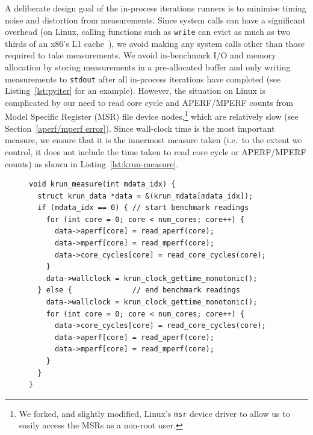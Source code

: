 \documentclass[preprint,numbers,10pt]{sigplanconf}
\begin{document}
A deliberate design goal of the in-process iterations runners is to minimise
timing noise and distortion from measurements. Since system calls can have a
significant overhead (on Linux, calling functions such as \texttt{write} can
evict as much as two thirds of an x86's L1 cache~\cite{soares10flexsc}), we
avoid making any system calls other than those required to take measurements. We
avoid in-benchmark I/O and memory allocation by storing measurements in a
pre-allocated buffer and only writing measurements to \texttt{stdout} after all
in-process iterations have completed (see Listing~\ref{lst:pyiter} for an
example). However, the situation on Linux is complicated by our need to read
core cycle and APERF/MPERF counts from Model Specific Register (MSR) file device
nodes,\footnote{We forked, and slightly modified, Linux's \texttt{msr} device
driver to allow us to easily access the MSRs as a non-root user.} which are relatively
slow (see Section~\ref{aperf/mperf error}). Since wall-clock time
is the most important measure, we ensure that it is the innermost measure taken
(i.e.~to the extent we control, it does not include the time taken to read
core cycle or APERF/MPERF counts) as shown in Listing~\ref{lst:krun-measure}.

\begin{figure}[t]
\begin{lstlisting}[label=lst:krun-measure, xleftmargin=0cm,
        caption={%
\texttt{krun\_measure}: Measuring before (the \texttt{if's} true branch) and
after (its false branch) a benchmark. Since
wall-clock time is the most important measure, it is innermost; since
the APERF/MPERF counters are a sanity check, they are outermost. Note that
the APERF/MPERF counters must be read in the same order before
and after a benchmark.}]
void krun_measure(int mdata_idx) {
  struct krun_data *data = &(krun_mdata[mdata_idx]);
  if (mdata_idx == 0) { // start benchmark readings
    for (int core = 0; core < num_cores; core++) {
      data->aperf[core] = read_aperf(core);
      data->mperf[core] = read_mperf(core);
      data->core_cycles[core] = read_core_cycles(core);
    }
    data->wallclock = krun_clock_gettime_monotonic();
  } else {              // end benchmark readings
    data->wallclock = krun_clock_gettime_monotonic();
    for (int core = 0; core < num_cores; core++) {
      data->core_cycles[core] = read_core_cycles(core);
      data->aperf[core] = read_aperf(core);
      data->mperf[core] = read_mperf(core);
    }
  }
}
\end{lstlisting}
\vspace{-.75cm}
\end{figure}
\end{document}
